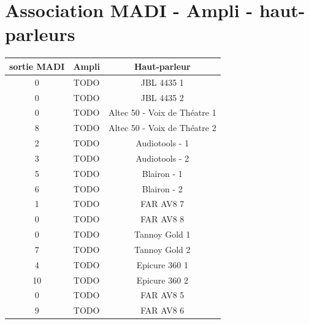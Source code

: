 \documentclass[12pt,a4paper]{report}
\begin{document}
 \chapter*{Association MADI - Ampli - haut-parleurs}
 \begin{center}
 \begin{tabular}{|c|c|c|}
 \hline 
 sortie MADI & Ampli & Haut-parleur \\ 
\hline 
0 & TODO & JBL 4435 1 \\ 
 \hline 
0 & TODO & JBL 4435 2 \\ 
 \hline 
0 & TODO & Altec 50 - Voix de Théatre 1 \\ 
 \hline 
8 & TODO & Altec 50 - Voix de Théatre 2 \\ 
 \hline 
2 & TODO & Audiotools - 1 \\ 
 \hline 
3 & TODO & Audiotools - 2 \\ 
 \hline 
5 & TODO & Blairon - 1 \\ 
 \hline 
6 & TODO & Blairon - 2 \\ 
 \hline 
1 & TODO & FAR AV8 7 \\ 
 \hline 
0 & TODO & FAR AV8 8 \\ 
 \hline 
0 & TODO & Tannoy Gold 1 \\ 
 \hline 
7 & TODO & Tannoy Gold 2 \\ 
 \hline 
4 & TODO & Epicure 360 1 \\ 
 \hline 
10 & TODO & Epicure 360 2 \\ 
 \hline 
0 & TODO & FAR AV8 5 \\ 
 \hline 
9 & TODO & FAR AV8 6 \\ 
 \hline 

 \end{tabular}  

 \end{center}
 
\end{document}
